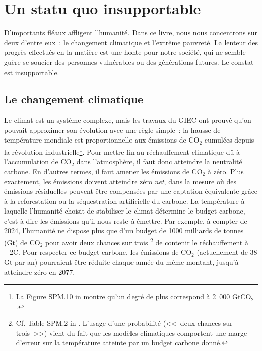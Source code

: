 \documentclass[a5paper,french,openany]{memoir}
\begin{document}
\chapter{Un statu quo insupportable\label{ch:statu_quo}}

D'importants fléaux affligent l'humanité. Dans ce livre, nous nous 
concentrons sur deux d'entre eux~: le changement climatique et l'extrême pauvreté. La lenteur des progrès effectués en la matière est une honte pour notre société, qui ne semble guère se soucier des personnes vulnérables ou des générations futures. Le constat est insupportable.

\section{Le changement climatique}

Le climat est un système complexe, mais les travaux du GIEC ont prouvé qu'on pouvait approximer son évolution avec une règle simple~: la hausse de température mondiale est proportionnelle aux émissions de CO$_\text{2}$ cumulées depuis la révolution industrielle\footnote{La Figure SPM.10 in \citet{ipcc_climate_2021} montre qu'un degré de plus correspond à 2~000 GtCO$_\text{2}$.}. 
Pour mettre fin au réchauffement climatique dû à l'accumulation de CO$_\text{2}$ dans l'atmosphère, il faut donc atteindre la neutralité carbone. En d'autres termes, il faut amener les émissions de CO$_\text{2}$ à zéro. Plus exactement, les émissions doivent atteindre zéro \textit{net}, dans la mesure où des émissions résiduelles peuvent être compensées par une captation équivalente grâce à la reforestation ou la séquestration artificielle du carbone. La température à laquelle l'humanité choisit de stabiliser le climat détermine le budget carbone, c'est-à-dire les émissions qu'il nous reste à émettre. Par exemple, à compter de 2024, l'humanité ne dispose plus que d'un budget de 1000 milliards de tonnes (Gt) de CO$_\text{2}$ pour avoir deux chances sur trois%
\footnote{Cf. Table SPM.2 in \citet{ipcc_climate_2021}. L'usage d'une probabilité (<<~deux chances sur trois~>>) vient du fait que les modèles climatiques comportent une marge d'erreur sur la température atteinte par un budget carbone donné.} de contenir le réchauffement à +2\textdegree{}C. 
Pour respecter ce budget carbone, les émissions de CO$_\text{2}$ (actuellement de 38 Gt par an) pourraient être réduite chaque année du même montant, jusqu'à atteindre zéro en 2077.  %
\end{document}
